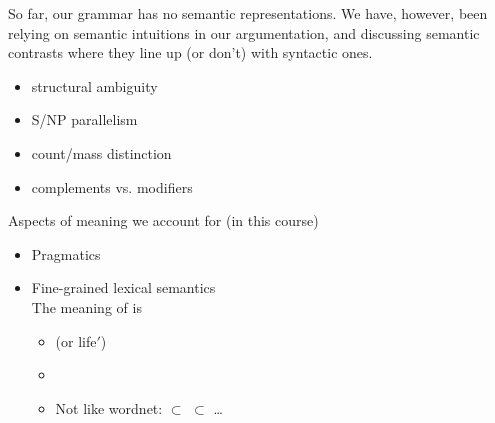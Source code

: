 \documentclass[a4paper,landscape,headrule,footrule]{foils}
\begin{document}

So far, our grammar has no semantic representations. We
have, however, been relying on semantic intuitions in our
argumentation, and discussing semantic contrasts where
they line up (or don't) with syntactic ones.

\begin{itemize}

\item structural ambiguity
\item S/NP parallelism
\item count/mass distinction
\item complements vs. modifiers
\end{itemize}


Aspects of meaning we  account for (in this course)
\begin{itemize}
\item Pragmatics
\item Fine-grained lexical semantics
  \\ The meaning of  is
  \begin{itemize}\addtolength{\itemsep}{2ex}
  \item {}  (or \textsf{life}$'$)
\item
\item Not like wordnet: 
  $\subset$  $\subset$  \ldots

 \end{itemize}

 \end{itemize}
\end{document}
